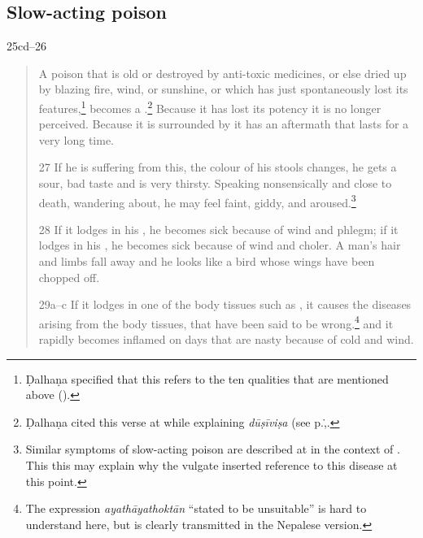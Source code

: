 \begin{translation}
    \subsection{Slow-acting poison}
    \item[25cd--26]  
    \begin{verse}
        A poison that is old or destroyed by anti-toxic medicines, or
else dried up by blazing fire, wind, or sunshine, or which has
just spontaneously lost its features,\footnote{Ḍalhaṇa
    specified that this refers to the ten qualities that are
    mentioned above ().} becomes a
    .\footnote{Ḍalhaṇa cited
        this verse at  while explaining
        \emph{dūṣīviṣa} (see p.\.,\pageref{dusivisa}.} Because it has
        lost its potency it is no longer perceived.  Because it is
        surrounded by  it has an aftermath that
        lasts for a very long time.
        
        \item[27] If he is suffering from this, the colour of his stools changes,
he gets a sour, bad taste and is very thirsty. Speaking nonsensically 
and close
to death, wandering about, he may feel faint, giddy, and
aroused.\footnote{Similar symptoms of slow-acting poison are described at
 in the context of  .  This this may explain why the vulgate inserted reference to this
disease at this point.}
        
        
        



        \item[28]
        If it lodges in his , he becomes sick because of wind 
        and phlegm; if it lodges in his , he becomes sick 
        because of  wind and 
        choler.  A man's hair and limbs fall away and he looks like a
        bird whose wings have been chopped off.
        \item[29a--c]
        If it lodges in one of the body tissues such as 
        , it causes the diseases arising
        from the body tissues, that have been said to be wrong.\footnote{The 
        expression \emph{ayathāyathoktān} “stated to be unsuitable” is hard to 
        understand here, but is clearly transmitted in the Nepalese version.}
        and it rapidly becomes inflamed on days that are nasty
        because of cold and wind.
        

\end{verse}
\end{translation}
